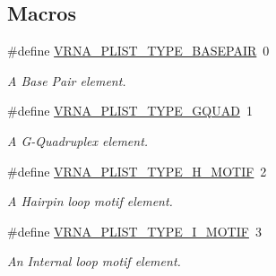 \subsection*{Macros}
\begin{DoxyCompactItemize}
\item 
\mbox{\label{group__struct__utils__plist_ga7c7484a8a1e6704b1aefaf589f3b27c1}} 
\#define \hyperlink{group__struct__utils__plist_ga7c7484a8a1e6704b1aefaf589f3b27c1}{V\+R\+N\+A\+\_\+\+P\+L\+I\+S\+T\+\_\+\+T\+Y\+P\+E\+\_\+\+B\+A\+S\+E\+P\+A\+IR}~0
\begin{DoxyCompactList}\small\item\em A Base Pair element. \end{DoxyCompactList}\item 
\mbox{\label{group__struct__utils__plist_gac91ab79e9feede5347103949ecf04f8a}} 
\#define \hyperlink{group__struct__utils__plist_gac91ab79e9feede5347103949ecf04f8a}{V\+R\+N\+A\+\_\+\+P\+L\+I\+S\+T\+\_\+\+T\+Y\+P\+E\+\_\+\+G\+Q\+U\+AD}~1
\begin{DoxyCompactList}\small\item\em A G-\/\+Quadruplex element. \end{DoxyCompactList}\item 
\mbox{\label{group__struct__utils__plist_ga4d142e0187b8410b61ec2b168ed4513e}} 
\#define \hyperlink{group__struct__utils__plist_ga4d142e0187b8410b61ec2b168ed4513e}{V\+R\+N\+A\+\_\+\+P\+L\+I\+S\+T\+\_\+\+T\+Y\+P\+E\+\_\+\+H\+\_\+\+M\+O\+T\+IF}~2
\begin{DoxyCompactList}\small\item\em A Hairpin loop motif element. \end{DoxyCompactList}\item 
\mbox{\label{group__struct__utils__plist_gadf5905518079b5495bce3394cd7afb9a}} 
\#define \hyperlink{group__struct__utils__plist_gadf5905518079b5495bce3394cd7afb9a}{V\+R\+N\+A\+\_\+\+P\+L\+I\+S\+T\+\_\+\+T\+Y\+P\+E\+\_\+\+I\+\_\+\+M\+O\+T\+IF}~3
\begin{DoxyCompactList}\small\item\em An Internal loop motif element. \end{DoxyCompactList}\item 
\mbox{\label{group__struct__utils__plist_ga01d749cdb675dcdbac1dc5103378c699}} 

\end{DoxyCompactItemize}
